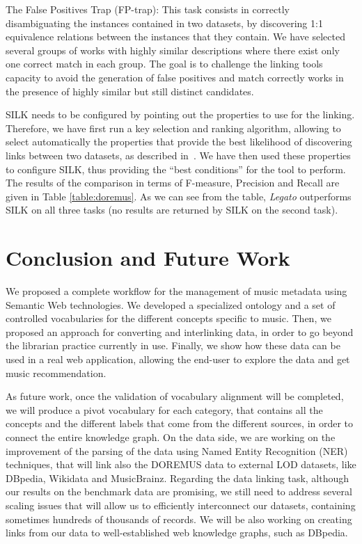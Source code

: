 The False Positives Trap (FP-trap): This task consists in correctly disambiguating the instances contained in two datasets, by discovering 1:1 equivalence relations between the instances that they contain. We have selected several groups of works with highly similar descriptions where there exist only one correct match in each group. The goal is to challenge the linking tools capacity to avoid the generation of false positives and match correctly works in the presence of highly similar but still distinct candidates.

SILK needs to be configured by pointing out the properties to use for the linking. Therefore, we have first run a key selection and ranking algorithm, allowing to select automatically the properties that provide the best likelihood of discovering links between two datasets, as described in~\cite{achichi2016automatic}. We have then used these properties to configure SILK, thus providing the ``best conditions'' for the tool to perform. The results of the comparison in terms of F-measure, Precision and Recall are given in Table \ref{table:doremus}. As we can see from the table, \textit{Legato} outperforms SILK on all three tasks (no results are returned by SILK on the second task). 


\section{Conclusion and Future Work}
\label{sec:conclusion}
We proposed a complete workflow for the management of music metadata using Semantic Web technologies. We developed a specialized ontology and a set of controlled vocabularies for the different concepts specific to music. Then, we proposed an approach for converting and interlinking data, in order to go beyond the librarian practice currently in use. Finally, we show how these data can be used in a real web application, allowing the end-user to explore the data and get music recommendation.

As future work, once the validation of vocabulary alignment will be completed, we will produce a pivot vocabulary for each category, that contains all the concepts and the different labels that come from the different sources, in order to connect the entire knowledge graph. On the data side, we are working on the improvement of the parsing of the data using Named Entity Recognition (NER) techniques, that will link also the DOREMUS data to external LOD datasets, like DBpedia, Wikidata and MusicBrainz. Regarding the data linking task, although our results on the benchmark data are promising, we still need to address several scaling issues that will allow us to efficiently interconnect our datasets, containing sometimes hundreds of thousands of records. We will be also working on creating links from our data to well-established web knowledge graphs, such as DBpedia.

